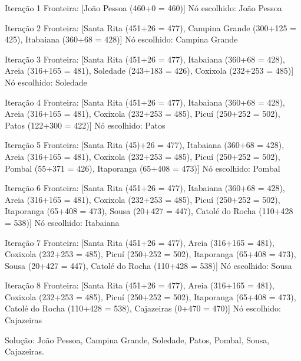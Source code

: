 \documentclass[brazil,]{article}
\newenvironment{Shaded}{\begin{snugshade}}{\end{snugshade}}
\newcommand{\NormalTok}[1]{#1}
\begin{document}
\begin{Shaded}
\begin{Highlighting}[]
\NormalTok{Iteração 1}
\NormalTok{Fronteira: [João Pessoa (460+0 = 460)]}
\NormalTok{Nó escolhido: João Pessoa}

\NormalTok{Iteração 2}
\NormalTok{Fronteira: [Santa Rita (451+26 = 477), Campina Grande (300+125 = 425),}
\NormalTok{            Itabaiana (360+68 = 428)]}
\NormalTok{Nó escolhido: Campina Grande}

\NormalTok{Iteração 3}
\NormalTok{Fronteira: [Santa Rita (451+26 = 477), Itabaiana (360+68 = 428),}
\NormalTok{            Areia (316+165 = 481), Soledade (243+183 = 426),}
\NormalTok{            Coxixola (232+253 = 485)]}
\NormalTok{Nó escolhido: Soledade}

\NormalTok{Iteração 4}
\NormalTok{Fronteira: [Santa Rita (451+26 = 477), Itabaiana (360+68 = 428),}
\NormalTok{            Areia (316+165 = 481), Coxixola (232+253 = 485),}
\NormalTok{            Picuí (250+252 = 502), Patos (122+300 = 422)]}
\NormalTok{Nó escolhido: Patos}

\NormalTok{Iteração 5}
\NormalTok{Fronteira: [Santa Rita (45)+26 = 477), Itabaiana (360+68 = 428),}
\NormalTok{            Areia (316+165 = 481), Coxixola (232+253 = 485),}
\NormalTok{            Picuí (250+252 = 502), Pombal (55+371 = 426),}
\NormalTok{            Itaporanga (65+408 = 473)]}
\NormalTok{Nó escolhido: Pombal}

\NormalTok{Iteração 6}
\NormalTok{Fronteira: [Santa Rita (451+26 = 477), Itabaiana (360+68 = 428),}
\NormalTok{            Areia (316+165 = 481), Coxixola (232+253 = 485),}
\NormalTok{            Picuí (250+252 = 502), Itaporanga (65+408 = 473),}
\NormalTok{            Sousa (20+427 = 447), Catolé do Rocha (110+428 = 538)]}
\NormalTok{Nó escolhido: Itabaiana}

\NormalTok{Iteração 7}
\NormalTok{Fronteira: [Santa Rita (451+26 = 477), Areia (316+165 = 481),}
\NormalTok{            Coxixola (232+253 = 485), Picuí (250+252 = 502),}
\NormalTok{            Itaporanga (65+408 = 473), Sousa (20+427 = 447),}
\NormalTok{            Catolé do Rocha (110+428 = 538)]}
\NormalTok{Nó escolhido: Sousa}

\NormalTok{Iteração 8}
\NormalTok{Fronteira: [Santa Rita (451+26 = 477), Areia (316+165 = 481),}
\NormalTok{            Coxixola (232+253 = 485), Picuí (250+252 = 502),}
\NormalTok{            Itaporanga (65+408 = 473), Catolé do Rocha (110+428 = 538),}
\NormalTok{            Cajazeiras (0+470 = 470)]}
\NormalTok{Nó escolhido: Cajazeiras}

\NormalTok{Solução: João Pessoa, Campina Grande, Soledade, Patos, Pombal,}
\NormalTok{         Sousa, Cajazeiras.}
\end{Highlighting}
\end{Shaded}
\end{document}
